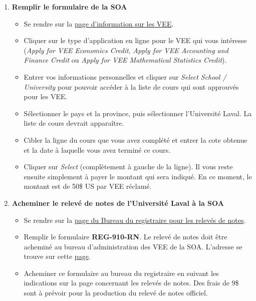 \begin{enumerate}
\item \textbf{Remplir le formulaire de la SOA}
\begin{itemize}
\item Se rendre sur la \href{https://soa.org/education/exam-req/edu-vee.aspx}{page d'information sur les VEE}. 
\item Cliquer sur le type d'application en ligne pour le VEE qui vous intéresse (\textit{Apply for VEE Economics Credit}, \textit{Apply for VEE Accounting and Finance Credit} ou \textit{Apply for VEE Mathematical Statistics Credit}).
\item Entrer vos informations personnelles et cliquer sur \textit{Select School / University} pour pouvoir accéder à la liste de cours qui sont approuvés pour les VEE.
\item Sélectionner le pays et la province, puis sélectionner l'Université Laval. La liste de cours devrait apparaître. 
\item Cibler la ligne du cours que vous avez complété et entrer la cote obtenue et la date à laquelle vous avez terminé ce cours. 
\item Cliquer sur \textit{Select} (complètement à gauche de la ligne). Il vous reste ensuite simplement à payer le montant qui sera indiqué. En ce moment, le montant est de 50\$ US par VEE réclamé.
\end{itemize}\vspace{\baselineskip} \newpage
\item \textbf{Acheminer le relevé de notes de l'Université Laval à la SOA}
\begin{itemize}
\item Se rendre sur la \href{https://www.reg.ulaval.ca/cms/DemDoc/releveNotes}{page du Bureau du registraire pour les relevés de notes}.
\item Remplir le formulaire \textbf{REG-910-RN}. Le relevé de notes doit être acheminé au bureau d'administration des VEE de la SOA. L'adresse se trouve sur cette \href{https://soa.org/education/exam-req/course-info/edu-vee-applying-process.aspx}{page}.
\item Acheminer ce formulaire au bureau du registraire en suivant les indications sur la page concernant les relevés de notes. Des frais de 9\$ sont à prévoir pour la production du relevé de notes officiel.
\end{itemize}
\end{enumerate}

\newpage

